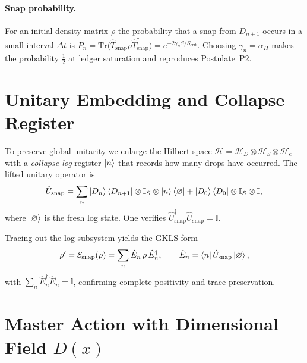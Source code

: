 \documentclass[a4paper, 12pt, oneside]{book}
\numberwithin{equation}{chapter}
\begin{document}
\paragraph{Snap probability.}
For an initial density matrix $\rho$ the probability that
a snap from $D_{n+1}$ occurs in a small interval $\Delta t$ is
$P_{n}=\mathrm{Tr}\bigl(\hat T_{\mathrm{snap}}\rho
 \hat T_{\mathrm{snap}}^{\dagger}\bigr)=e^{-2\gamma_n S/S_{\mathrm{crit}}}$.
Choosing
$\gamma_n=\alpha_H$ makes the probability $\tfrac12$ at ledger
saturation and reproduces Postulate~P2.

\section{Unitary Embedding and Collapse Register}
\label{sec:CollapseRegister}

To preserve global unitarity we enlarge the Hilbert space
\(\mathcal H=\mathcal H_D\otimes\mathcal H_S\otimes\mathcal H_{\mathrm c}\)
with a \emph{collapse‑log} register $\ket{n}$ that records how many
drops have occurred.  The lifted unitary operator is
\begin{equation}
  \hat U_{\mathrm{snap}}
  = \sum_{n}\ket{D_{n}}\bra{D_{n+1}}\otimes\mathbb I_S
          \otimes\ket{n}\bra{\varnothing}
    + \ket{D_{0}}\bra{D_{0}}\otimes\mathbb I_S\otimes\mathbb I,\label{eq:U_snap}
\end{equation}
where $\ket{\varnothing}$ is the fresh log state.  One verifies
$\hat U_{\mathrm{snap}}^{\dagger}\hat U_{\mathrm{snap}}\!=\!\mathbb I$.

Tracing out the log subsystem yields the GKLS form
\begin{equation}
  \rho' = \mathcal E_{\mathrm{snap}}(\rho)
        = \sum_{n}\hat E_n\,\rho\,\hat E_n^{\dagger},
  \qquad \hat E_n = \bra{n}\hat U_{\mathrm{snap}}\ket{\varnothing},
  \label{eq:CPTP}
\end{equation}
with $\sum_n\hat E_n^{\dagger}\hat E_n=\mathbb I$, confirming
complete positivity and trace preservation.

\section[Master Action with Dimensional Field]{Master Action with Dimensional Field \texorpdfstring{$D(x)$}{}}
\label{sec:MasterActionH}
\end{document}
